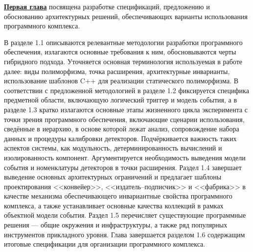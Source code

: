 \underline{\textbf{Первая глава}} посвящена разработке
спецификаций, предложению и обоснованию архитектурных решений,
обеспечивающих варианты использования программного комплекса.

В разделе 1.1 описываются релевантные методологии разработки
программного обеспечения, излагаются основные требования к ним,
обосновываются черты гибридного подхода. Уточняется основная
терминология используемая в работе далее: виды полиморфизма,
точка расширения, архитектурные инварианты, использование
шаблонов C++ для реализации статического полиморфизма.
В соответствии с предложенной методологией в
разделе 1.2 фиксируется специфика предметной
области, включающую логический триггер и модель события,
а в разделе 1.3 кратко излагаются основные этапы жизненного
цикла эксперимента с точки зрения программного обеспечения,
включающие сценарии использования, сведённые в
иерархию, в основе которой лежат анализ, сопровождение набора данных
и процедуры калибровки детекторов. Подчёркивается
важность таких аспектов системы, как модульность,
детерминированность вычислений и изолированность компонент.
Аргументируется необходимость выведения модели события
и номенклатуры детекторов в точки расширения.
Раздел 1.4 завершает выведение основных архитектурных
ограничений и предлагает шаблоны
проектирования <<конвейер>>, <<издатель--подписчик>>
и <<фабрика>> в качестве механизма обеспечивающего
инвариантные свойства программного комплекса, а также
устанавливает основные качества коллекций в рамках
объектной модели события. Раздел 1.5 перечисляет существующие
программные решения --- общие окружения и инфраструктуры, а также
ряд популярных инструментов прикладного уровня.
Глава завершается разделом 1.6 содержащим итоговые
спецификации для организации программного комплекса.


